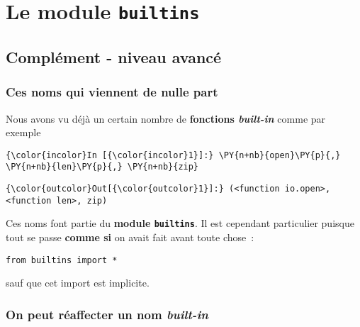     \hypertarget{le-module-builtins}{%
\section{\texorpdfstring{Le module
\texttt{builtins}}{Le module builtins}}\label{le-module-builtins}}

    \hypertarget{compluxe9ment---niveau-avancuxe9}{%
\subsection{Complément - niveau
avancé}\label{compluxe9ment---niveau-avancuxe9}}

    \hypertarget{ces-noms-qui-viennent-de-nulle-part}{%
\subsubsection{Ces noms qui viennent de nulle
part}\label{ces-noms-qui-viennent-de-nulle-part}}

    Nous avons vu déjà un certain nombre de \textbf{fonctions
\emph{built-in}} comme par exemple

    \begin{Verbatim}[commandchars=\\\{\}]
{\color{incolor}In [{\color{incolor}1}]:} \PY{n+nb}{open}\PY{p}{,} \PY{n+nb}{len}\PY{p}{,} \PY{n+nb}{zip}
\end{Verbatim}


\begin{Verbatim}[commandchars=\\\{\}]
{\color{outcolor}Out[{\color{outcolor}1}]:} (<function io.open>, <function len>, zip)
\end{Verbatim}
            
    Ces noms font partie du \textbf{module \texttt{builtins}}. Il est
cependant particulier puisque tout se passe \textbf{comme si} on avait
fait avant toute chose~:

\begin{verbatim}
from builtins import *
\end{verbatim}

sauf que cet import est implicite.

    \hypertarget{on-peut-ruxe9affecter-un-nom-built-in}{%
\subsubsection{\texorpdfstring{On peut réaffecter un nom
\emph{built-in}}{On peut réaffecter un nom built-in}}\label{on-peut-ruxe9affecter-un-nom-built-in}}

